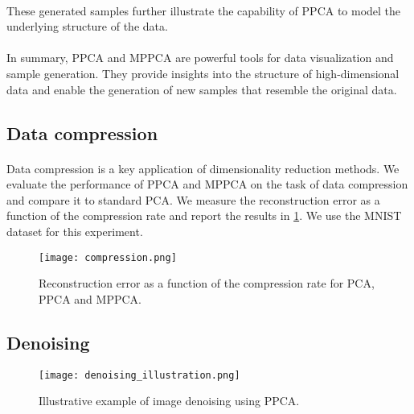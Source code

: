 \documentclass{article}
\begin{document}
\paragraph{} These generated samples further illustrate the capability of PPCA to model the underlying structure of the data.

\paragraph{} In summary, PPCA and MPPCA are powerful tools for data visualization and sample generation. They provide insights into the structure of high-dimensional data and enable the generation of new samples that resemble the original data.

\subsection{Data compression}



\paragraph{} Data compression is a key application of dimensionality reduction methods. We evaluate the performance of PPCA and MPPCA on the task of data compression and compare it to standard PCA. We measure the reconstruction error as a function of the compression rate and report the results in \cref{fig:compression}. We use the MNIST dataset for this experiment.

\begin{figure}[H]
    \centering
    \texttt{[image: compression.png]}
    \caption{Reconstruction error as a function of the compression rate for PCA, PPCA and MPPCA.}
    \label{fig:compression}
\end{figure}

\subsection{Denoising}

\begin{figure}[H]
    \centering
    \texttt{[image: denoising\_illustration.png]}
    \caption{Illustrative example of image denoising using PPCA.}
    \label{fig:denoising_illustration}
\end{figure}
\end{document}
